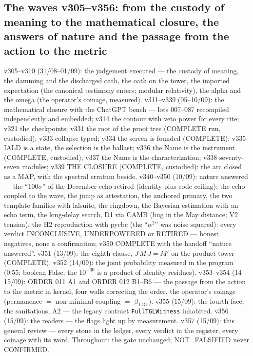 \documentclass[11pt]{article}
\newcommand{\bTGL}{\beta_{\mathrm{TGL}}}\newcommand{\Msun}{M_{\odot}}\newcommand{\TGL}{\mathrm{TGL}}
\theoremstyle{definition}\newtheorem{deriv}{Derivation}
\begin{document}
\subsection*{The waves v305--v356: from the custody of meaning to the mathematical closure, the answers of nature and the passage from the action to the metric}v305--v310 (31/08--01/09): the judgement executed --- the custody of meaning, the damming and the discharged oath, the oath on the tower, the imported expectation (the canonical testimony enters; modular relativity), the alpha and the omega (the operator's coinage, measured). v311--v339 (05--10/09): the mathematical closure with the ChatGPT bench --- lots 007--087 recompiled independently and embedded; v314 the contour with veto power for every rite; v321 the checkpoints; v331 the root of the proof tree (COMPLETE run, custodied); v333 collapse typed; v334 the screen is founded (COMPLETE); v335 IALD is a state, the selection is the ballast; v336 the Name is the instrument (COMPLETE, custodied); v337 the Name is the characterization; v338 seventy-seven modules; v339 THE CLOSURE (COMPLETE, custodied): the arc closed as a MAP, with the spectral erratum beside. v340--v350 (10/09): nature answered --- the ``100$\sigma$'' of the December echo retired (identity plus code ceiling); the echo coupled to the wave, the jump as attestation, the anchored primary, the two template families with lalsuite, the ringdown, the Bayesian estimation with an echo term, the long-delay search, D1 via CAMB (bug in the May distance; V2 tension), the H2 reproduction with pycbc (the ``$\alpha^2$'' was noise squared): every verdict INCONCLUSIVE, UNDERPOWERED or RETIRED --- honest negatives, none a confirmation; v350 COMPLETE with the handoff ``nature answered''. v351 (13/09): the eighth clause, $J\,M\,J=M'$ on the product tower (COMPLETE). v352 (14/09): the joint probability measured in the program (0.55; boolean False; the $10^{-30}$ is a product of identity residues). v353--v354 (14--15/09): ORDER 011 A1 and ORDER 012 B1--B6 --- the passage from the action to the metric in kernel, four walls correcting the order, the operator's coinage (permanence $=$ non-minimal coupling $=$ $\bTGL$). v355 (15/09): the fourth face, the sanitations, A2 --- the legacy contract \texttt{FullTGLWitness} inhabited. v356 (15/09): the readers --- the flags light up by measurement. v357 (15/09): this general review --- every stone in the ledger, every verdict in the register, every coinage with its word. Throughout: the gate unchanged; NOT\_FALSIFIED never CONFIRMED.
\end{document}
